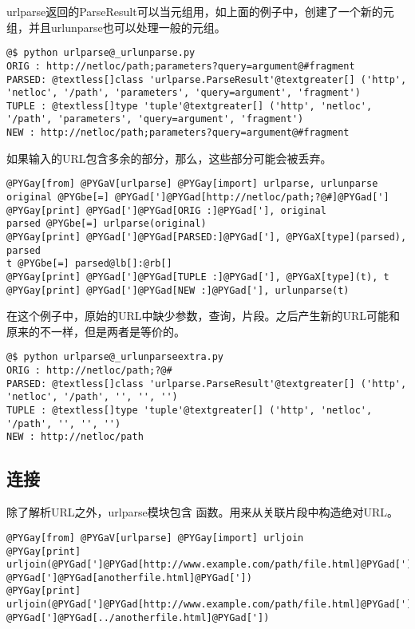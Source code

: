\documentclass[a4paper,10pt,english]{manual}
\begin{document}
urlparse返回的ParseResult可以当元组用，如上面的例子中，创建了一个新的元组，并且urlunparse也可以处理一般的元组。

\begin{Verbatim}[commandchars=@\[\]]
@$ python urlparse@_urlunparse.py
ORIG : http://netloc/path;parameters?query=argument@#fragment
PARSED: @textless[]class 'urlparse.ParseResult'@textgreater[] ('http', 'netloc', '/path', 'parameters', 'query=argument', 'fragment')
TUPLE : @textless[]type 'tuple'@textgreater[] ('http', 'netloc', '/path', 'parameters', 'query=argument', 'fragment')
NEW : http://netloc/path;parameters?query=argument@#fragment
\end{Verbatim}

如果输入的URL包含多余的部分，那么，这些部分可能会被丢弃。

\begin{Verbatim}[commandchars=@\[\]]
@PYGay[from] @PYGaV[urlparse] @PYGay[import] urlparse, urlunparse
original @PYGbe[=] @PYGad[']@PYGad[http://netloc/path;?@#]@PYGad[']
@PYGay[print] @PYGad[']@PYGad[ORIG :]@PYGad['], original
parsed @PYGbe[=] urlparse(original)
@PYGay[print] @PYGad[']@PYGad[PARSED:]@PYGad['], @PYGaX[type](parsed), parsed
t @PYGbe[=] parsed@lb[]:@rb[]
@PYGay[print] @PYGad[']@PYGad[TUPLE :]@PYGad['], @PYGaX[type](t), t
@PYGay[print] @PYGad[']@PYGad[NEW :]@PYGad['], urlunparse(t)
\end{Verbatim}

在这个例子中，原始的URL中缺少参数，查询，片段。之后产生新的URL可能和原来的不一样，但是两者是等价的。

\begin{Verbatim}[commandchars=@\[\]]
@$ python urlparse@_urlunparseextra.py
ORIG : http://netloc/path;?@#
PARSED: @textless[]class 'urlparse.ParseResult'@textgreater[] ('http', 'netloc', '/path', '', '', '')
TUPLE : @textless[]type 'tuple'@textgreater[] ('http', 'netloc', '/path', '', '', '')
NEW : http://netloc/path
\end{Verbatim}


\subsection{连接}

除了解析URL之外，urlparse模块包含  函数。用来从关联片段中构造绝对URL。

\begin{Verbatim}[commandchars=@\[\]]
@PYGay[from] @PYGaV[urlparse] @PYGay[import] urljoin
@PYGay[print] urljoin(@PYGad[']@PYGad[http://www.example.com/path/file.html]@PYGad['], @PYGad[']@PYGad[anotherfile.html]@PYGad['])
@PYGay[print] urljoin(@PYGad[']@PYGad[http://www.example.com/path/file.html]@PYGad['], @PYGad[']@PYGad[../anotherfile.html]@PYGad['])
\end{Verbatim}
\end{document}
